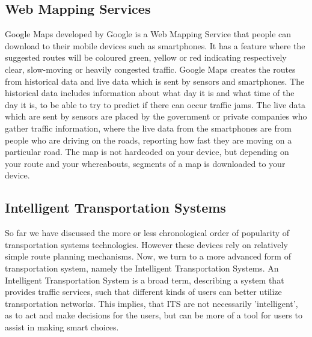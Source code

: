 \subsection*{Web Mapping Services}
%
Google Maps developed by Google is a Web Mapping Service that people can download to their mobile devices such as smartphones. It has a feature where the suggested routes will be coloured green, yellow or red indicating respectively clear, slow-moving or heavily congested traffic. 
Google Maps creates the routes from historical data and live data which is sent by sensors and smartphones. The historical data includes information about what day it is and what time of the day it is, to be able to try to predict if there can occur traffic jams. The live data which are sent by sensors are placed by the government or private companies who gather traffic information, where the live data from the smartphones are from people who are driving on the roads, reporting how fast they are moving on a particular road. The map is not hardcoded on your device, but depending on your route and your whereabouts, segments of a map is downloaded to your device.

\subsection*{Intelligent Transportation Systems}
So far we have discussed the more or less chronological order of popularity of transportation systems technologies. However these devices rely on relatively simple route planning mechanisms. Now, we turn to a more advanced form of transportation system, namely the Intelligent Transportation Systems. An Intelligent Transportation System is a broad term, describing a system that provides traffic services, such that different kinds of users can better utilize transportation networks. This implies, that ITS are not necessarily 'intelligent', as to act and make decisions for the users, but can be more of a tool for users to assist in making smart choices.
